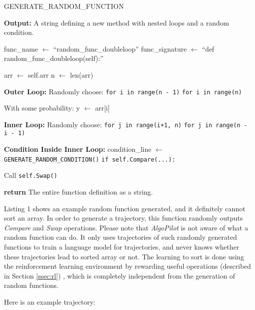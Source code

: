 \documentclass[pdflatex,sn-mathphys-num]{sn-jnl}%
\theoremstyle{thmstyleone}%
\theoremstyle{thmstyletwo}%
\theoremstyle{thmstylethree}%
\begin{document}
\begin{algorithm}
\caption{GENERATE\_RANDOM\_FUNCTION}
\label{alg:generate_random_function}
\begin{algorithmic}
\State \textbf{Output:} A string defining a new method with nested loops and a random condition.

\State func\_name $\gets$ ``random\_func\_doubleloop'' 
\State func\_signature $\gets$ ``def random\_func\_doubleloop(self):''

\State arr $\gets$ self.arr 
\State n $\gets$ len(arr)

\State \textbf{Outer Loop:}
\State Randomly choose:
\State \hspace{1em} \texttt{for i in range(n - 1)}
\State \hspace{1em} \texttt{for i in range(n)}

\State With some probability:
\State \hspace{1em} y $\gets$ arr[i] 

\State \textbf{Inner Loop:}
\State Randomly choose:
\State \hspace{1em} \texttt{for j in range(i+1, n)}
\State \hspace{1em} \texttt{for j in range(n - i - 1)}

\State \textbf{Condition Inside Inner Loop:}
\State condition\_line $\gets$ \texttt{GENERATE\_RANDOM\_CONDITION()}
\State \texttt{if self.Compare(...):} 

\State \hspace{1em} Call \texttt{self.Swap()}

\State \textbf{return} The entire function definition as a string.
\end{algorithmic}
\end{algorithm}

Listing 1 shows an example random function generated, and it definitely cannot sort an array. In order to generate a trajectory, this function randomly outputs \emph{Compare} and \emph{Swap} operations. Please note that \emph{AlgoPilot} is not aware of what a random function can do. It only uses trajectories of such randomly generated functions to train a language model for trajectories, and never knows whether these trajectories lead to sorted array or not. The learning to sort is done using the reinforcement learning environment by rewarding useful operations (described in Section \ref{ssec:rl}) , which is completely independent from the generation of random functions. 

Here is an example trajectory: 
\end{document}

